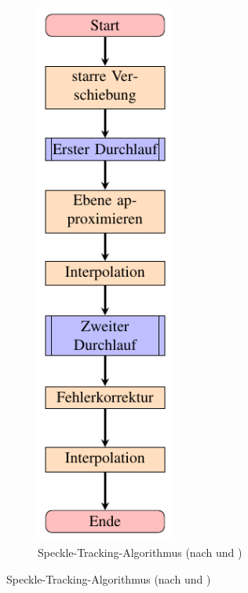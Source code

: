 \begin{figure}[htbp]
	\centering
	\begin{subfigure}[b]{0.3\textwidth}
		\centering
		\includegraphics[width=0.5\textwidth]{pdf/graph_speckle}
		\caption[Speckle-Tracking]{Speckle-Tracking-Algorithmus (nach  und \cite{Coj17})}

\end{subfigure}
\end{figure}
